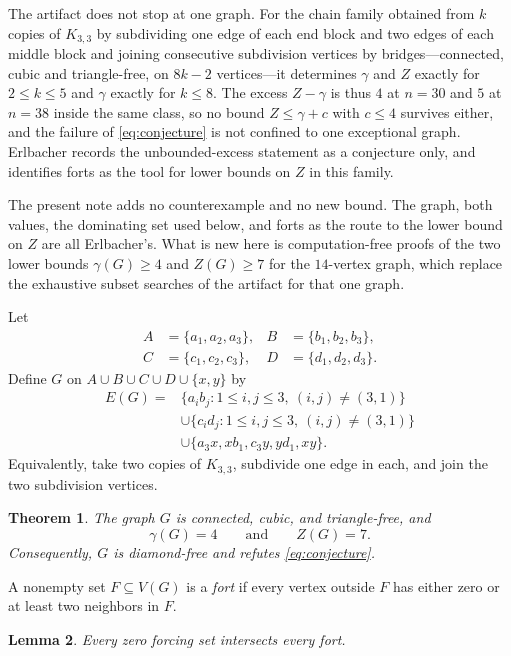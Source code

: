 \documentclass[11pt]{amsart}
\newtheorem{theorem}{Theorem}
\newtheorem{lemma}[theorem]{Lemma}
\begin{document}
The artifact does not stop at one graph.  For the chain family obtained from
$k$ copies of $K_{3,3}$ by subdividing one edge of each end block and two
edges of each middle block and joining consecutive subdivision vertices by
bridges---connected, cubic and triangle-free, on $8k-2$ vertices---it
determines $\gamma$ and $Z$ exactly for $2\leq k\leq5$ and $\gamma$ exactly
for $k\leq8$.  The excess $Z-\gamma$ is thus $4$ at $n=30$ and $5$ at $n=38$
inside the same class, so no bound $Z\leq\gamma+c$ with $c\leq4$ survives
either, and the failure of \eqref{eq:conjecture} is not confined to one
exceptional graph.  Erlbacher records the unbounded-excess statement as a
conjecture only,
and identifies forts as the tool for lower bounds on $Z$ in this family.

The present note adds no counterexample and no new bound.  The graph, both
values, the dominating set used below, and forts as the route to the lower
bound on $Z$ are all Erlbacher's.  What is new here is computation-free proofs
of the two lower bounds $\gamma(G)\geq4$ and $Z(G)\geq7$ for the $14$-vertex
graph, which replace the exhaustive subset searches of the artifact for that
one graph.

Let
\[
\begin{aligned}
 A&=\{a_1,a_2,a_3\}, & B&=\{b_1,b_2,b_3\},\\
 C&=\{c_1,c_2,c_3\}, & D&=\{d_1,d_2,d_3\}.
\end{aligned}
\]
Define $G$ on $A\cup B\cup C\cup D\cup\{x,y\}$ by
\[
\begin{aligned}
E(G)={}&\{a_i b_j:1\leq i,j\leq 3,\ (i,j)\neq(3,1)\}\\
&\cup\{c_i d_j:1\leq i,j\leq 3,\ (i,j)\neq(3,1)\}\\
&\cup\{a_3x,xb_1,c_3y,yd_1,xy\}.
\end{aligned}
\]
Equivalently, take two copies of $K_{3,3}$, subdivide one edge in each, and
join the two subdivision vertices.

\begin{theorem}\label{thm:main}
The graph $G$ is connected, cubic, and triangle-free, and
\[
  \gamma(G)=4
  \qquad\text{and}\qquad
  Z(G)=7.
\]
Consequently, $G$ is diamond-free and refutes \eqref{eq:conjecture}.
\end{theorem}

A nonempty set $F\subseteq V(G)$ is a \emph{fort} if every vertex outside
$F$ has either zero or at least two neighbors in $F$.

\begin{lemma}\label{lem:fort}
Every zero forcing set intersects every fort.
\end{lemma}
\end{document}
